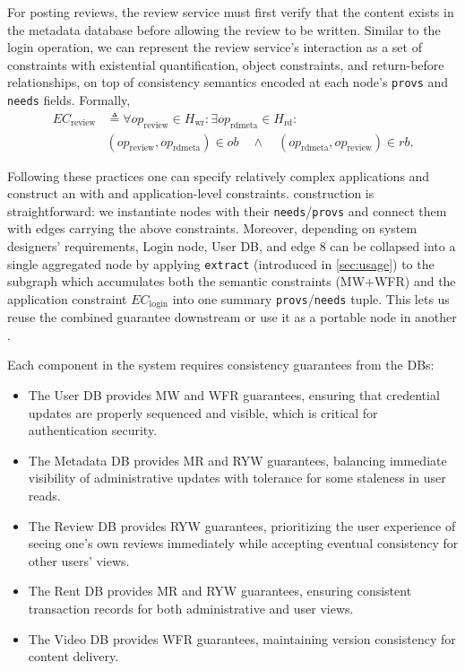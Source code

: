 For posting reviews,
the review service must first verify that the content exists in the
metadata database before allowing the review to be written. Similar to
the login operation, we can represent the review service's interaction
as a set of constraints with existential quantification, object constraints,
and return-before relationships, on top of consistency semantics
encoded at each node's \texttt{provs} and \texttt{needs} fields. Formally,
\begin{align*}
EC_{\text{review}} &\triangleq \forall op_{\text{review}} \in H_{\text{wr}} : \exists op_{\text{rdmeta}} \in H_{\text{rd}} :\\
&(op_{\text{review}}, op_{\text{rdmeta}}) \in ob \quad \land \quad (op_{\text{rdmeta}}, op_{\text{review}}) \in rb.
\end{align*}

Following these practices one can specify relatively complex applications and construct an \sysgraph with \sysmods and application-level constraints.
\sysgraph construction is straightforward: we instantiate nodes with their
\texttt{needs}/\texttt{provs} and connect them with edges carrying the above constraints.
Moreover, depending on system designers' requirements, Login node, User DB, and edge 8 can be collapsed into a single
aggregated node by applying \texttt{extract} (introduced in \cref{sec:usage}) to the subgraph which accumulates
both the semantic constraints (MW+WFR) and the application constraint $EC_{\text{login}}$ into one summary \texttt{provs}/\texttt{needs} tuple.
This lets us reuse the combined guarantee downstream or use it as a portable node in another \sysgraph.


Each component in the system requires consistency guarantees
from the DBs:%
\begin{itemize}
\item The User DB provides MW and WFR guarantees, ensuring
  that credential updates are properly sequenced and visible, which
  is critical for authentication security.
\item The Metadata DB provides MR and RYW guarantees,
  balancing immediate visibility of administrative updates with
  tolerance for some staleness in user reads.
\item The Review DB provides RYW guarantees, prioritizing the
  user experience of seeing one's own reviews immediately while
  accepting eventual consistency for other users' views.
\item The Rent DB provides MR and RYW guarantees, ensuring
  consistent transaction records for both administrative and user views.
\item The Video DB provides WFR guarantees, maintaining
  version consistency for content delivery.
\end{itemize}

